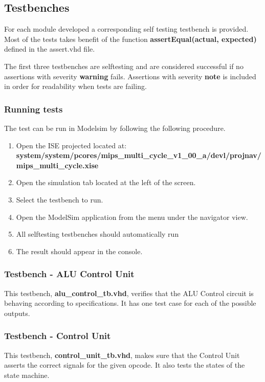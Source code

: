 \subsection{Testbenches}

For each module developed a corresponding self testing testbench is provided. Most of the tests takes benefit of the function {\bf assertEqual(actual, expected) } defined in the assert.vhd file.

The first three testbenches are selftesting and are considered successful if no assertions with severity {\bf warning} fails. Assertions with severity {\bf note} is included in order for readability when tests are failing.

\subsubsection{Running tests}
The test can be run in Modelsim by following the following procedure.


\begin{enumerate}
\item Open the ISE projected located at:  \\ {\bf system/system/pcores/mips\_multi\_cycle\_v1\_00\_a/devl/projnav/mips\_multi\_cycle.xise}
\item Open the simulation tab located at the left of the screen. 
\item Select the testbench to run.
\item Open the ModelSim application from the menu under the navigator view. 
\item All selftesting testbenches should automatically run
\item The result should appear in the console. 
\end{enumerate}

\subsubsection{Testbench - ALU Control Unit}
This testbench, {\bf alu\_control\_tb.vhd}, verifies that the ALU Control circuit is behaving according to specifications. It has one test case for each of the possible outputs.
\subsubsection{Testbench - Control Unit}
This testbench, {\bf control\_unit\_tb.vhd}, makes sure that the Control Unit asserts the correct signals for the given opcode. It also tests the states of the state machine.
